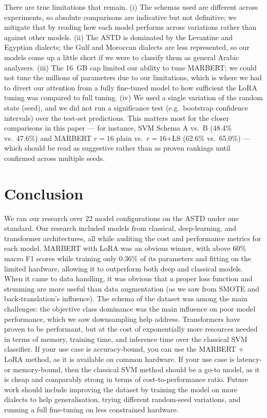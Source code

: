 \documentclass[conference]{IEEEtran}
\begin{document}
There are true limitations that remain. (i) The schemas used are different
across experiments, so absolute comparisons are indicative but not definitive; we mitigate that
by reading how each model performs across variations rather than against other models. (ii) The ASTD
is dominated by the Levantine and Egyptian dialects; the Gulf and Moroccan dialects are less represented,
so our models come up a little short if we were to classify them as general Arabic analysers.
(iii) The 16~GB cap limited our ability to tune MARBERT; we could not tune the millions of parameters
due to our limitations, which is where we had to divert our attention from a fully fine-tuned model
to how sufficient the LoRA tuning was compared to full tuning. (iv) We used a single variation
of the random state (seed), and we did not run a significance test (e.g.\ bootstrap confidence
intervals) over the test-set predictions. This matters most for the closer comparisons in this
paper --- for instance, SVM Schema A vs.\ B (48.4\% vs.\ 47.6\%) and MARBERT $r{=}16$ plain vs.\
$r{=}16$+LS (62.6\% vs.\ 65.0\%) --- which should be read as suggestive rather than as proven
rankings until confirmed across multiple seeds.

\section{Conclusion}

We ran our research over 22 model configurations on the ASTD under one standard. Our research
included models from classical, deep-learning, and transformer architectures, all
while auditing the cost and performance metrics for each model. MARBERT with LoRA
was an obvious winner, with above 60\% macro F1 scores while training only 0.36\% of its parameters
and fitting on the limited hardware, allowing it to outperform both deep and classical models.
When it came to data handling, it was obvious that a proper loss function and stemming
are more useful than data augmentation (as we saw from SMOTE and back-translation's influence).
The schema of the dataset was among the main challenges: the objective class dominance
was the main influence on poor model performance, which we saw downsampling help address.
Transformers have proven to be performant, but at the cost of exponentially more resources needed
in terms of memory, training time, and inference time over the classical SVM classifier.
If your use case is accuracy-bound, you can use the MARBERT + LoRA method, as it is available
on common hardware. If your use case is latency- or memory-bound, then the classical SVM method
should be a go-to model, as it is cheap and comparably strong in terms of cost-to-performance ratio.
Future work should include improving the dataset by training the model on more dialects to help generalisation,
trying different random-seed variations, and running a full fine-tuning on less constrained hardware.



\end{document}
